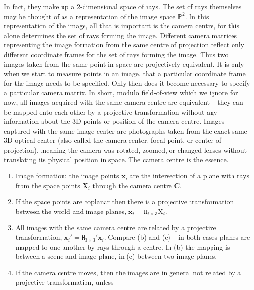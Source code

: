 \documentclass{report}
\begin{document}
\begin{itemize}
            \bigbreak \noindent 
            In fact, they make up a 2-dimensional space of rays. The set of rays themselves may be thought of as a representation of the image space $\mathbb{P}^{2}$. In this representation of the image, all that is important is the camera centre, for this alone determines the set of rays forming the image. Different camera matrices representing the image formation from the same centre of projection reflect only different coordinate frames for the set of rays forming the image. Thus two images taken from the same point in space are projectively equivalent. It is only when we start to measure points in an image, that a particular coordinate frame for the image needs to be specified. Only then does it become necessary to specify a particular camera matrix. In short, modulo field-of-view which we ignore for now, all images acquired with the same camera centre are equivalent – they can be mapped onto each other by a projective transformation without any information about the 3D points or position of the camera centre.
            \bigbreak \noindent 
            Images captured with the same image center are photographs taken from the exact same 3D optical center (also called the camera center, focal point, or center of projection), meaning the camera was rotated, zoomed, or changed lenses without translating its physical position in space.
            \bigbreak \noindent 
            \bigbreak \noindent 
            The camera centre is the essence. 
            \begin{enumerate}[label=(\alph*)]
                \item Image formation: the image points $\mathbf{x}_{i}$ are the intersection of a plane with rays from the space points $\mathbf{X}_{i}$ through the camera centre $\mathbf{C}$. 
                \item If the space points are coplanar then there is a projective transformation between the world and image planes, $\mathbf{x}_{i}=\mathtt{H}_{3\times 3}$X${}_{i}$. 
                \item All images with the same camera centre are related by a projective transformation, $\mathbf{x}_{i}'=\mathtt{H}_{3\times 3}'\mathbf{x}_{i}$. Compare (b) and (c) – in both cases planes are mapped to one another by rays through a centre. In (b) the mapping is between a scene and image plane, in (c) between two image planes. 
                \item If the camera centre moves, then the images are in general not related by a projective transformation, unless 

\end{enumerate}
\end{itemize}
\end{document}
